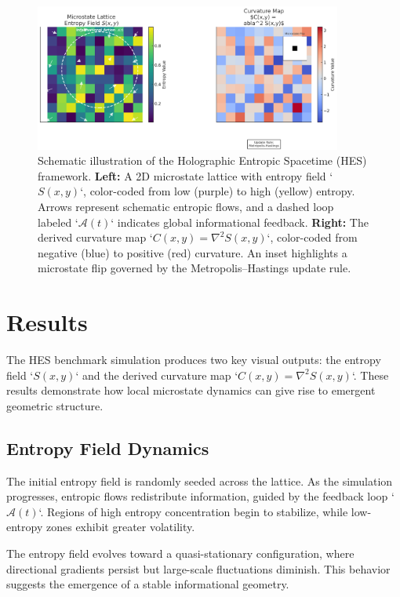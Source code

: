 \documentclass[12pt]{article}
\begin{document}
\begin{figure}[ht]
    \centering
    \includegraphics[width=0.9\textwidth]{Figures/Figure_5.png}
    \caption{
        Schematic illustration of the Holographic Entropic Spacetime (HES) framework.  
        \textbf{Left:} A 2D microstate lattice with entropy field `\( S(x, y) \)`, color-coded from low (purple) to high (yellow) entropy. Arrows represent schematic entropic flows, and a dashed loop labeled `\( \mathcal{A}(t) \)` indicates global informational feedback.  
        \textbf{Right:} The derived curvature map `\( C(x, y) = \nabla^2 S(x, y) \)`, color-coded from negative (blue) to positive (red) curvature. An inset highlights a microstate flip governed by the Metropolis–Hastings update rule.
    }
    \label{fig:HES_schematic}
\end{figure}

\section{Results}

The HES benchmark simulation produces two key visual outputs: the entropy field `\( S(x, y) \)` and the derived curvature map `\( C(x, y) = \nabla^2 S(x, y) \)`. These results demonstrate how local microstate dynamics can give rise to emergent geometric structure.

\subsection{Entropy Field Dynamics}

The initial entropy field is randomly seeded across the lattice. As the simulation progresses, entropic flows redistribute information, guided by the feedback loop `\( \mathcal{A}(t) \)`. Regions of high entropy concentration begin to stabilize, while low-entropy zones exhibit greater volatility.

The entropy field evolves toward a quasi-stationary configuration, where directional gradients persist but large-scale fluctuations diminish. This behavior suggests the emergence of a stable informational geometry.
\end{document}
